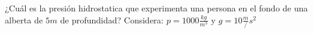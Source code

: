 
\question ¿Cuál es la presión hidrostatica que experimenta una persona en el
fondo de una alberta de $5 m$ de profundidad? Considera: $p = 1000
\frac{kg}{m^3} $ y $ g = 10 \frac{m}/{s^2}$

